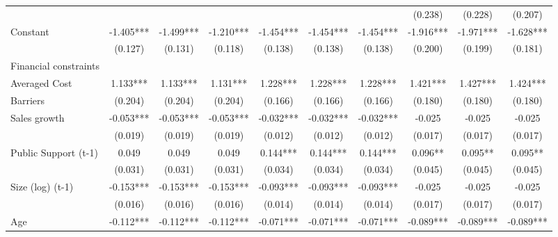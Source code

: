 \begin{table}[htbp]
\begin{tabular}{l*{9}{c}}
                    &               &               &               &               &               &               &     (0.238)   &     (0.228)   &     (0.207)   \\
Constant            &      -1.405***&      -1.499***&      -1.210***&      -1.454***&      -1.454***&      -1.454***&      -1.916***&      -1.971***&      -1.628***\\
                    &     (0.127)   &     (0.131)   &     (0.118)   &     (0.138)   &     (0.138)   &     (0.138)   &     (0.200)   &     (0.199)   &     (0.181)   \\
\hline
Financial constraints&               &               &               &               &               &               &               &               &               \\
Averaged Cost       &       1.133***&       1.133***&       1.131***&       1.228***&       1.228***&       1.228***&       1.421***&       1.427***&       1.424***\\
Barriers            &     (0.204)   &     (0.204)   &     (0.204)   &     (0.166)   &     (0.166)   &     (0.166)   &     (0.180)   &     (0.180)   &     (0.180)   \\
Sales growth        &      -0.053***&      -0.053***&      -0.053***&      -0.032***&      -0.032***&      -0.032***&      -0.025   &      -0.025   &      -0.025   \\
                    &     (0.019)   &     (0.019)   &     (0.019)   &     (0.012)   &     (0.012)   &     (0.012)   &     (0.017)   &     (0.017)   &     (0.017)   \\
Public Support (t-1)&       0.049   &       0.049   &       0.049   &       0.144***&       0.144***&       0.144***&       0.096** &       0.095** &       0.095** \\
                    &     (0.031)   &     (0.031)   &     (0.031)   &     (0.034)   &     (0.034)   &     (0.034)   &     (0.045)   &     (0.045)   &     (0.045)   \\
Size (log) (t-1)    &      -0.153***&      -0.153***&      -0.153***&      -0.093***&      -0.093***&      -0.093***&      -0.025   &      -0.025   &      -0.025   \\
                    &     (0.016)   &     (0.016)   &     (0.016)   &     (0.014)   &     (0.014)   &     (0.014)   &     (0.017)   &     (0.017)   &     (0.017)   \\
Age                 &      -0.112***&      -0.112***&      -0.112***&      -0.071***&      -0.071***&      -0.071***&      -0.089***&      -0.089***&      -0.089***\\

\end{tabular}
\end{table}
